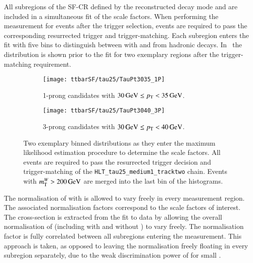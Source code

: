 All subregions of the SF-CR defined by the reconstructed \tauhadvis
decay mode and \pT are included in a simultaneous fit of the scale
factors. When performing the measurement for events after the
\tauhadvis trigger selection, events are required to pass the
corresponding resurrected trigger and trigger-matching. Each subregion
enters the fit with five \mTW bins to distinguish between \ttbar with
\faketauhadvis and \tauhadvis from hadronic \taulepton
decays. In~ the \mTW
distribution is shown prior to the fit for two exemplary regions after
the trigger-matching requirement.


\begin{figure}[htbp]
  \centering

  \begin{subfigure}{.485\textwidth}
    \texttt{[image: ttbarSF/tau25/TauPt3035\_1P]}
    \caption{1-prong \tauhadvis candidates with
      $\SI{30}{\ensuremath{\text{GeV}}} \leq p_{\text{T}} < \SI{35}{\ensuremath{\text{GeV}}}$.}
  \end{subfigure}\hfill%
  \begin{subfigure}{.485\textwidth}
    \texttt{[image: ttbarSF/tau25/TauPt3040\_3P]}
    \caption{3-prong \tauhadvis candidates with
      $\SI{30}{\GeV} \leq \pT < \SI{40}{\GeV}$.}
  \end{subfigure}

  \caption{Two exemplary binned \mTW distributions as they enter the
    maximum likelihood estimation procedure to determine the
    \faketauhadvis scale factors. All events are required to pass the
    resurrected trigger decision and trigger-matching of the
    \texttt{HLT\_tau25\_medium1\_tracktwo} chain. Events with
    $m_{\text{T}}^W > \SI{200}{\ensuremath{\text{GeV}}}$ are merged into the last bin of the
    histograms.}%
  \label{fig:ttbarsf_mtw_examples_prefit}
\end{figure}

The normalisation of \ttbar with \faketauhadvis is allowed to vary
freely in every measurement region. The associated normalisation
factors correspond to the \faketauhadvis scale factors of
interest. The \ttbar cross-section is extracted from the fit to data
by allowing the overall normalisation of \ttbar (including \ttbar with
and without \faketauhadvis) to vary freely. The \ttbar normalisation
factor is fully correlated between all subregions entering the
measurement. This approach is taken, as opposed to leaving the \ttbar
normalisation freely floating in every subregion separately, due to
the weak discrimination power of \mTW for small \tauhadvis \pT.


